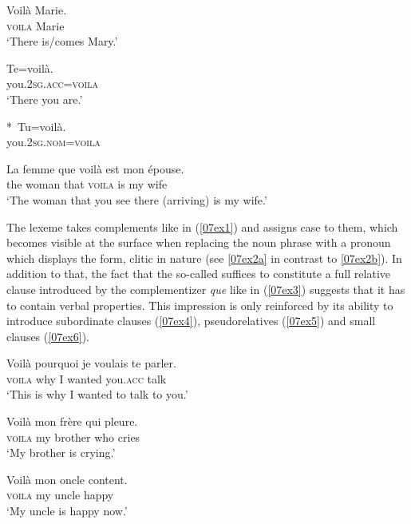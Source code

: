 \documentclass[output=paper,colorlinks,citecolor=brown]{langscibook}
\begin{document}
\begin{exe}
	\ex \label{07ex1}
	\gll Voilà Marie. \\
	\textsc{voila} Marie \\
	\trans ‘There is/comes Mary.’
	
	\ex \label{07ex2}
	\begin{xlist}
		\ex \label{07ex2a} \gll Te=voilà. \\
		you.\textsc{2sg.acc=voila} \\
		\trans ‘There you are.’
		
		\ex \label{07ex2b} *~\gll Tu=voilà. \\
		you.\textsc{2sg.nom=voila} \\
	\end{xlist}
	
	\ex \label{07ex3}
	\gll La femme que voilà est mon épouse. \\
	the woman that \textsc{voila} is my wife \\
	\trans ‘The woman that you see there (arriving) is my wife.’
\end{exe}

The lexeme takes complements like in (\ref{07ex1}) and assigns  case to them, which becomes visible at the surface when replacing the noun phrase with a pronoun which displays the  form, clitic in nature (see \ref{07ex2a} in contrast to \ref{07ex2b}). In addition to that, the fact that the so-called  suffices to constitute a full relative clause introduced by the complementizer \emph{que} like in (\ref{07ex3}) suggests that it has to contain verbal properties. This impression is only reinforced by its ability to introduce subordinate clauses (\ref{07ex4}), pseudorelatives (\ref{07ex5}) and small clauses (\ref{07ex6}).

\begin{exe}
	\ex \label{07ex4} \gll Voilà pourquoi je voulais te parler. \\
	\textsc{voila} why I wanted you.\textsc{acc} talk \\
	\trans ‘This is why I wanted to talk to you.’
	
	\ex \label{07ex5} \gll Voilà mon frère qui pleure. \\
	\textsc{voila} my brother who cries \\
	\trans ‘My brother is crying.’
	
	\ex \label{07ex6} \gll Voilà mon oncle content. \\
	\textsc{voila} my uncle happy \\
	\trans ‘My uncle is happy now.’
\end{exe}
\end{document}
